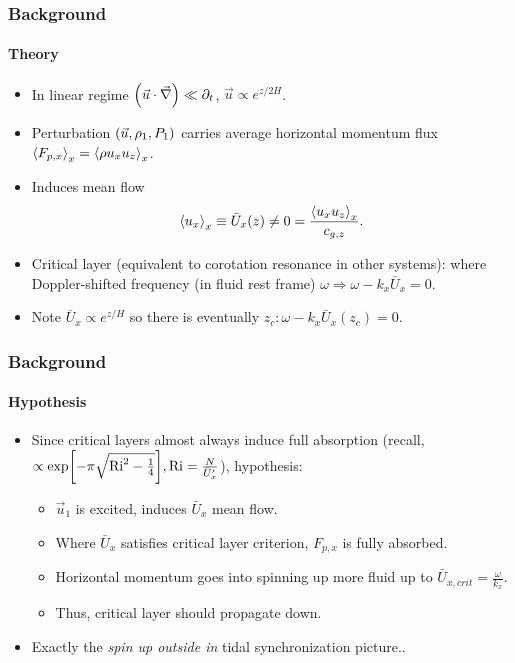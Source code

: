 \documentclass[dvipsnames, 10pt]{beamer}
\DeclarePairedDelimiter\ev{\langle}{\rangle}
\DeclarePairedDelimiter\p{\lparen}{\rparen}
\DeclarePairedDelimiter\s{\lbrack}{\rbrack}
\begin{document}
\begin{frame}
    \frametitle{Background}
    \framesubtitle{Theory}

    \begin{itemize}
        \item In linear regime $\p*{\vec{u} \cdot \vec{\nabla}} \ll \partial_t$,
            $\vec{u} \propto e^{z/2H}$.

        \item Perturbation $\p*{\vec{u}, \rho_1, P_1}$ carries average
            horizontal momentum flux $\ev*{F_{p, x}}_x = \ev*{\rho u_x u_z}_x$.

        \item Induces mean flow
            \begin{equation}
                 \ev*{u_x}_x \equiv \bar{U}_x(z) \neq 0
                    = \frac{\ev*{u_xu_z}_x}{c_{g, z}}.
            \end{equation}

        \item Critical layer (equivalent to corotation resonance in other
            systems): where Doppler-shifted frequency (in fluid rest frame)
            $\omega \Rightarrow \omega - k_x\bar{U}_x = 0$.

        \item Note $\bar{U}_x \propto e^{z/H}$ so there is eventually $z_c:
            \omega - k_x\bar{U}_x(z_c) = 0$.
    \end{itemize}
\end{frame}

\begin{frame}
    \frametitle{Background}
    \framesubtitle{Hypothesis}


    \begin{itemize}
        \item Since critical layers almost always induce full absorption
            (recall, $\propto \exp\s*{-\pi \sqrt{\mathrm{Ri}^2 -
            \frac{1}{4}}}, \mathrm{Ri} = \frac{N}{\bar{U}_x'}$),
            hypothesis:

            \begin{itemize}
                \item $\vec{u}_1$ is excited, induces $\bar{U}_x$ mean flow.

                \item Where $\bar{U}_x$ satisfies critical layer criterion,
                    $F_{p, x}$ is fully absorbed.

                \item Horizontal momentum goes into spinning up more fluid up to
                    $\bar{U}_{x, crit} = \frac{\omega}{k_x}$.

                \item Thus, critical layer should propagate down.
            \end{itemize}

        \item Exactly the \emph{spin up outside in} tidal synchronization
            picture..
    \end{itemize}
\end{frame}
\end{document}
